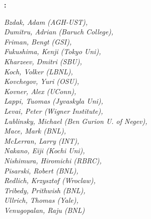 %
\vspace{0.5em}
\noindent
{\bf  \Investigator: }


{
\it
\noindent
Bzdak, Adam (AGH-UST), \\
Dumitru, Adrian (Baruch College),\\
Friman, Bengt (GSI),\\
Fukushima, Kenji (Tokyo Uni),\\ 
Kharzeev, Dmitri (SBU),\\
Koch, Volker (LBNL),\\
Kovchegov, Yuri (OSU),\\
Kovner, Alex (UConn),\\
Lappi, Tuomas (Jyvaskyla Uni),\\
Levai, Peter (Wigner Institute),\\ 
Lublinsky, Michael (Ben Gurion U. of Negev), \\
Mace, Mark (BNL),\\
McLerran, Larry (INT),\\ 
Nakano, Eiji (Kochi Uni),\\
Nishimura, Hiromichi (RBRC),\\
Pisarski, Robert (BNL), \\
Redlich, Krzysztof (Wroclaw),\\
Tribedy, Prithwish (BNL), \\
Ullrich, Thomas (Yale), \\
Venugopalan, Raju (BNL)
}
